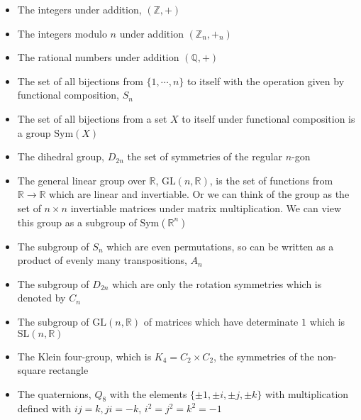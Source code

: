 \documentclass{article}
\begin{document}
\begin{itemize}
	\item The integers under addition, $ (\mathbb Z, +) $
	\item The integers modulo $ n $ under addition $ (\mathbb Z_n, +_n) $
	\item The rational numbers under addition $ (\mathbb Q, +) $
	\item The set of all bijections from $ \{1,\cdots,n\} $ to itself with the operation given by functional composition, $ S_n $
	\item The set of all bijections from a set $ X $ to itself under functional composition is a group $ \mathrm{Sym}(X) $
	\item The dihedral group, $ D_{2n} $ the set of symmetries of the regular $ n $-gon
\item The general linear group over $ \mathbb R $, $ \mathrm{GL}(n,\mathbb R) $, is the set of functions from $ \mathbb R\rightarrow \mathbb R $ which are linear and invertiable. Or we can think of the group as the set of $ n\times n $ invertiable matrices under matrix multiplication. We can view this group as a subgroup of $ \mathrm{Sym}(\mathbb R^n) $
\item The subgroup of $ S_n $ which are even permutations, so can be written as a product of evenly many transpositions, $ A_n $
\item The subgroup of $ D_{2n} $ which are only the rotation symmetries which is denoted by $ C_n $
\item The subgroup of $ \mathrm {GL}(n,\mathbb R) $ of matrices which have determinate $ 1 $ which is $ \mathrm {SL}(n,\mathbb R) $
\item The Klein four-group, which is $ K_4=C_2\times C_2 $, the symmetries of the non-square rectangle
\item The quaternions, $ Q_8 $ with the elements $ \{\pm 1, \pm i, \pm j, \pm k\} $ with multiplication defined with $ ij =k, ji = -k $, $ i^2=j^2=k^2=-1 $

\end{itemize}
\end{document}
